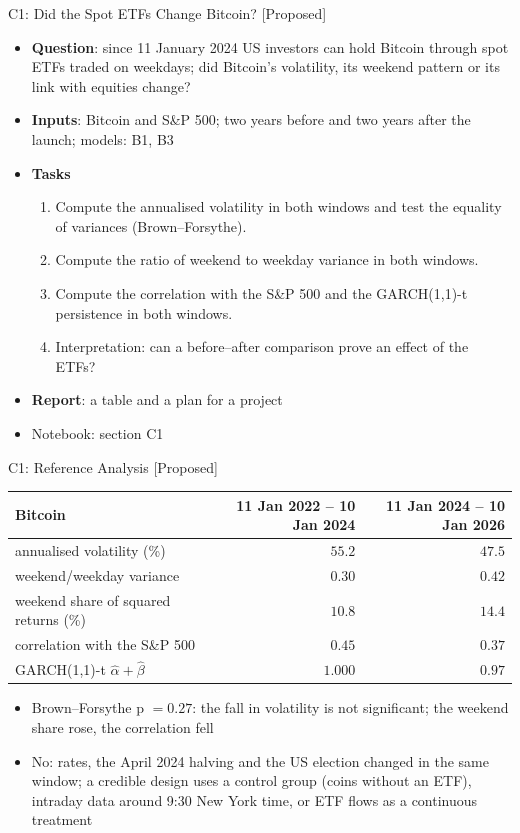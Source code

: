 \begin{frame}{C1: Did the Spot ETFs Change Bitcoin? [Proposed]}
\itemsize{\footnotesize}
\begin{itemize}
\item \textbf{Question}: since 11 January 2024 US investors can hold Bitcoin through spot ETFs traded on weekdays; did Bitcoin's volatility, its weekend pattern or its link with equities change?
\item \textbf{Inputs}: Bitcoin and S\&P 500; two years before and two years after the launch; models: B1, B3
\item \textbf{Tasks}
\begin{enumerate}
    \item Compute the annualised volatility in both windows and test the equality of variances (Brown--Forsythe).
    \item Compute the ratio of weekend to weekday variance in both windows.
    \item Compute the correlation with the S\&P 500 and the GARCH(1,1)-t persistence in both windows.
    \item Interpretation: can a before--after comparison prove an effect of the ETFs?
\end{enumerate}
\item \textbf{Report}: a table and a plan for a project
\item Notebook: section C1
\end{itemize}
\end{frame}

\ifsolutions
\begin{frame}{C1: Reference Analysis [Proposed]}
\itemsize{\footnotesize}
\begin{center}
\scriptsize
\begin{tabular}{lrr}
\toprule
Bitcoin & 11 Jan 2022 -- 10 Jan 2024 & 11 Jan 2024 -- 10 Jan 2026 \\
\midrule
annualised volatility (\%) & $55.2$ & $47.5$ \\
weekend/weekday variance & $0.30$ & $0.42$ \\
weekend share of squared returns (\%) & $10.8$ & $14.4$ \\
correlation with the S\&P 500 & $0.45$ & $0.37$ \\
GARCH(1,1)-t $\hat\alpha + \hat\beta$ & $1.000$ & $0.97$ \\
\bottomrule
\end{tabular}
\end{center}
\begin{itemize}
    \item Brown--Forsythe p $= 0.27$: the fall in volatility is not significant; the weekend share rose, the correlation fell
    \item No: rates, the April 2024 halving and the US election changed in the same window; a credible design uses a control group (coins without an ETF), intraday data around 9:30 New York time, or ETF flows as a continuous treatment
\end{itemize}
\end{frame}
\fi

